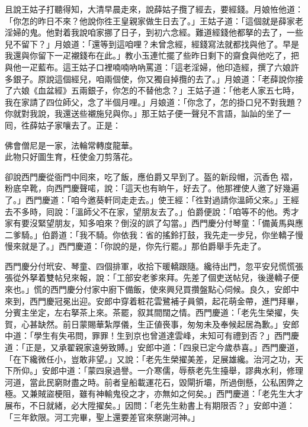 且說王姑子打聽得知，大清早晨走來，說薛姑子攬了經去，要經錢。月娘恠他道：「你怎的昨日不來？他說你徃王皇親家做生日去了。」王姑子道：「這個就是薛家老淫婦的鬼。他對着我說咱家挪了日子，到初六念經。難道經錢他都拏的去了，一些兒不留下？」月娘道：「還等到這咱哩？未曾念經，經錢寫法就都找與他了。早是我還與你留下一疋襯錢布在此。」教小玉連忙擺了些昨日剩下的齋食與他吃了，把與他一疋藍布。這王姑子口裡喃喃吶吶罵道：「這老淫婦，他印造經，撰了六娘許多銀子。原說這個經兒，咱兩個使，你又獨自掉攬的去了。」{}月娘道：「老薛說你接了六娘《血盆經》五兩銀子，你怎的不替他念？」王姑子道：「他老人家五七時，我在家請了四位師父，念了半個月哩。」月娘道：「你念了，怎的掛口兒不對我題？你就對我說，我還送些襯施兒與你。」那王姑子便一聲兒不言語，訕訕的坐了一囘，{}徃薛姑子家嚷去了。正是：

\begin{myquote} 
佛會僧尼是一家，法輪常轉度龍華。\\此物只好圖生育，枉使金刀剪落花。
\end{myquote} 

卻說西門慶從衙門中囘來，吃了飯，應伯爵又早到了。盔的新段帽，沉香色𧜽褶，粉底皁靴，{}向西門慶聲喏，說：「這天也有晌午，好去了。他那裡使人邀了好幾遍了。」西門慶道：「咱今邀葵軒同走走去。」使王經：「徃對過請你溫師父來。」王經去不多時，囘說：「溫師父不在家，望朋友去了。」伯爵便說：「咱等不的他。秀才家有要沒緊望朋友，知多咱來？倒沒的誤了勾當。」西門慶分付琴童：「備黃馬與應二爹騎。」伯爵道：「我不騎。你依我：省的搖鈴打鼓，我先走一步兒，你坐轎子慢慢來就是了。」西門慶道：「你說的是，你先行罷。」那伯爵舉手先走了。

西門慶分付玳安、琴童、四個排軍，收拾下暖轎跟隨。纔待出門，忽平安兒慌慌張張從外拏着雙帖兒來報，說：「工部安老爹來拜。先差了個吏送帖兒，後邊轎子便來也。」慌的西門慶分付家中廚下備飯，使來興兒買攢盤點心伺候。良久，安郎中來到，西門慶冠冕出迎。安郎中穿着粧花雲鷺補子員領，起花萌金帶，進門拜畢，分賓主坐定，左右拏茶上來。茶罷，叙其間闊之情。西門慶道：「老先生榮擢，失賀，心甚缺然。前日蒙賜華紮厚儀，生正値䘮事，匆匆未及奉候起居為歉。」安郎中道：「學生有失弔問，罪罪！生到京也曾道達雲峰，未知可有禮到否？」西門慶道：「正是，又承翟親家遠勞致賻。」{}安郎中道：「四泉已定今歲恭喜。」西門慶道，「在下纔微任小，豈敢非望。」又說：「老先生榮擢美差，足展雄纔。治河之功，天下所仰。」安郎中道：「蒙四泉過譽。一介寒儒，辱蔡老先生擡舉，謬典水利，修理河道，當此民窮財盡之時。前者皇船載運花石，毀閘折壩，所過倒懸，公私困弊之極。又兼賊盜梗阻，雖有神輸鬼役之才，亦無如之何矣。」西門慶道：「老先生大才展布，不日就緒，必大陞擢矣。」因問：「老先生勑書上有期限否？」安郎中道：「三年欽限。河工完畢，聖上還要差官來祭謝河神。」

